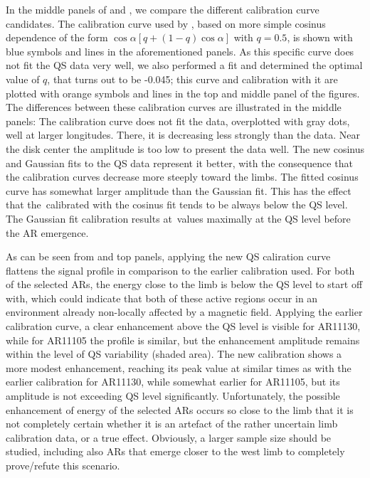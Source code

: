 \documentclass{aa}
\begin{document}
In the middle panels of  and , we compare the different calibration curve candidates.
The calibration curve used by 
\cite{SRB16},
based on more simple cosinus dependence of the form $\cos{\alpha} \left[q + \left(1-q \right) \cos{\alpha} \right]$ with $q=0.5$, is shown with blue symbols and lines in the aforementioned panels.
As this specific curve does not fit the QS data very well, we also performed a fit and determined the optimal value of $q$, that turns out to be -0.045; this curve and calibration with it are plotted with orange symbols and lines in the top and middle panel of the figures.
The differences between these calibration curves are illustrated in the middle panels: The \cite{SRB16} calibration
curve does not fit the data, overplotted with gray dots, well at larger longitudes. There, it 
is decreasing less strongly than the data. Near the disk center the amplitude is too low to present the data well.
The new cosinus and Gaussian fits to the QS
data represent it better, with the consequence that the calibration curves decrease more steeply toward the limbs.
The fitted cosinus curve has somewhat larger amplitude than the Gaussian fit. This has the effect that the \eft\,calibrated
with the cosinus fit tends to be always below the QS level. The Gaussian fit calibration results at \eft\,values maximally at the QS level before the AR emergence.

As can be seen
from  and  top panels, 
applying the new QS caliration curve flattens the signal profile in comparison to the earlier calibration used. For both of the selected ARs, the \fff energy close to the limb is below the QS level to start off with, which could indicate that both of these active regions occur in an environment already non-locally affected by a magnetic field. Applying the earlier calibration curve, a clear enhancement above the QS level is visible for AR11130, while for AR11105 the profile is similar, but the enhancement amplitude remains within the level of QS variability (shaded area). The new calibration shows a more modest enhancement, reaching its peak value at similar times as with the earlier calibration for AR11130, while somewhat earlier for AR11105, but its amplitude is not exceeding QS level significantly. Unfortunately, the possible enhancement of \fff energy of the selected ARs occurs so close to the limb that it is not completely certain whether it is an artefact of the rather uncertain limb calibration data, or a true effect. Obviously, a larger sample size should be studied, including also ARs that emerge closer to the west limb to completely prove/refute this scenario.  
\end{document}
